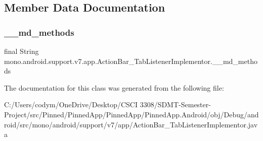 \subsection{Member Data Documentation}
\mbox{\label{classmono_1_1android_1_1support_1_1v7_1_1app_1_1_action_bar___tab_listener_implementor_a627fdd5a34632303bbbcda69734cdae1}} 
\subsubsection{\texorpdfstring{\+\_\+\+\_\+md\+\_\+methods}{\_\_md\_methods}}
{\footnotesize\ttfamily final String mono.\+android.\+support.\+v7.\+app.\+Action\+Bar\+\_\+\+Tab\+Listener\+Implementor.\+\_\+\+\_\+md\+\_\+methods\hspace{0.3cm}{\ttfamily [static]}}



The documentation for this class was generated from the following file\+:\begin{DoxyCompactItemize}
\item 
C\+:/\+Users/codym/\+One\+Drive/\+Desktop/\+C\+S\+C\+I 3308/\+S\+D\+M\+T-\/\+Semester-\/\+Project/src/\+Pinned/\+Pinned\+App/\+Pinned\+App/\+Pinned\+App.\+Android/obj/\+Debug/android/src/mono/android/support/v7/app/Action\+Bar\+\_\+\+Tab\+Listener\+Implementor.\+java\end{DoxyCompactItemize}
